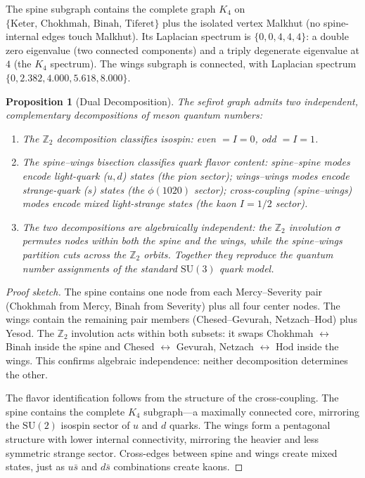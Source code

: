 \documentclass[11pt,a4paper]{amsart}
\newtheorem{proposition}[theorem]{Proposition}
\theoremstyle{remark}
\newcommand{\bbZ}{\mathbb{Z}}
\begin{document}
The spine subgraph contains the complete graph $K_4$ on
$\{\text{Keter, Chokhmah, Binah, Tiferet}\}$ plus the isolated vertex
Malkhut (no spine-internal edges touch Malkhut). Its Laplacian spectrum is
$\{0, 0, 4, 4, 4\}$: a double zero eigenvalue (two connected components)
and a triply degenerate eigenvalue at $4$ (the $K_4$ spectrum). The wings
subgraph is connected, with Laplacian spectrum
$\{0, 2.382, 4.000, 5.618, 8.000\}$.

\begin{proposition}[Dual Decomposition]
\label{prop:dual-decomp}
The sefirot graph admits two independent, complementary decompositions of
meson quantum numbers:
\begin{enumerate}[leftmargin=*,label=\textup{(\roman*)}]
\item The $\bbZ_2$ decomposition classifies isospin: even $= I = 0$,
  odd $= I = 1$.
\item The spine--wings bisection classifies quark flavor content:
  spine--spine modes encode light-quark ($u, d$) states (the pion sector);
  wings--wings modes encode strange-quark ($s$) states (the $\phi(1020)$
  sector); cross-coupling (spine--wings) modes encode mixed light-strange
  states (the kaon $I = 1/2$ sector).
\item The two decompositions are algebraically independent: the $\bbZ_2$
  involution $\sigma$ permutes nodes within both the spine and the wings,
  while the spine--wings partition cuts across the $\bbZ_2$ orbits. Together
  they reproduce the quantum number assignments of the standard $\mathrm{SU}(3)$
  quark model.
\end{enumerate}
\end{proposition}

\begin{proof}[Proof sketch]
The spine contains one node from each Mercy--Severity pair (Chokhmah from
Mercy, Binah from Severity) plus all four center nodes. The wings contain
the remaining pair members (Chesed--Gevurah, Netzach--Hod) plus Yesod. The
$\bbZ_2$ involution acts within both subsets: it swaps
Chokhmah $\leftrightarrow$ Binah inside the spine and
Chesed $\leftrightarrow$ Gevurah, Netzach $\leftrightarrow$ Hod inside the
wings. This confirms algebraic independence: neither decomposition determines
the other.

The flavor identification follows from the structure of the cross-coupling.
The spine contains the complete $K_4$ subgraph---a maximally connected
core, mirroring the $\mathrm{SU}(2)$ isospin sector of $u$ and $d$ quarks.
The wings form a pentagonal structure with lower internal connectivity,
mirroring the heavier and less symmetric strange sector. Cross-edges
between spine and wings create mixed states, just as $u\bar{s}$ and
$d\bar{s}$ combinations create kaons.
\end{proof}
\end{document}
